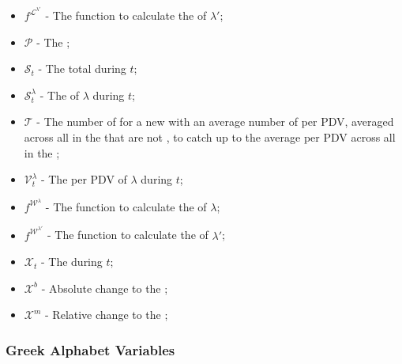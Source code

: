 \documentclass[class=article, crop=false]{standalone}
\begin{document}
\begin{itemize}[topsep=0pt, itemsep=3pt,leftmargin=16pt]
    \item[] $f^{\mathscr{L}^{\lambda'}}$ - The function to calculate the  of $\lambda'$;
    \item[] $\mathscr{P}$ - The ;
    \item[] $\mathscr{S}_{t}$ - The total  during $t$;
    \item[] $\mathscr{S}_{t}^{\lambda}$ - The  of $\lambda$ during $t$;
    \item[] $\mathscr{T}$ - The number of  for a new  with an average number of  per PDV, averaged across all  in the  that are not , to catch up to the average  per PDV across all  in the ;
    \item[] $\mathscr{V}_{t}^{\lambda}$ - The  per PDV of $\lambda$ during $t$;
    \item[] $f^{\mathscr{W}^{\lambda}}$ - The function to calculate the  of $\lambda$;
    \item[] $f^{\mathscr{W}^{\lambda'}}$ - The function to calculate the  of $\lambda'$;
    \item[] $\mathscr{X}_{t}$ - The  during $t$;
    \item[] $\mathscr{X}^{b}$ - Absolute change to the ;
    \item[] $\mathscr{X}^{m}$ - Relative change to the ;
\end{itemize}


\subsubsection{Greek Alphabet Variables}
\end{document}
